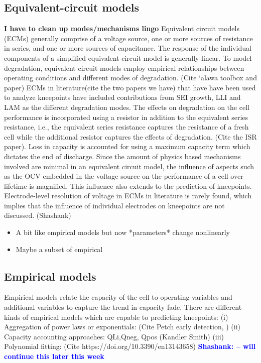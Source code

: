 \documentclass{article}
\newcommand{\ssr}[1]{{\textbf{\textcolor{blue}{Shashank: #1}}}}
\begin{document}
\subsection{Equivalent-circuit models}
\textbf{I have to clean up modes/mechanisms lingo}
Equivalent circuit models (ECMs) generally comprise of a voltage source, one or more sources of resistance in series, and one or more sources of capacitance. The response of the individual components of a simplified equivalent circuit model is generally linear. To model degradation, equivalent circuit models employ empirical relationships between operating conditions and different modes of degradation. (Cite ‘alawa toolbox and paper) ECMs in literature(cite the two papers we have) that have have been used to analyze kneepoints have included contributions from SEI growth, LLI and LAM as the different degradation modes. The effects on degradation on the cell performance is incorporated using a resistor in addition to the equivalent series resistance, i.e., the equivalent series resistance captures the resistance of a fresh cell while the additional resistor captures the effects of degradation. (Cite the ISR paper). Loss in capacity is accounted for using a maximum capacity term which dictates the end of discharge. Since the amount of physics based mechanisms involved are minimal in an equivalent circuit model, the influence of aspects such as the OCV embedded in the voltage source on the performance of a cell over lifetime is magnified. This influence also extends to the prediction of kneepoints. Electrode-level resolution of voltage in ECMs in literature is rarely found, which implies that the influence of individual electrodes on kneepoints are not discussed.
(Shashank)
\begin{itemize}
\item A bit like empirical models but now *parameters* change nonlinearly
\item Maybe a subset of empirical
\end{itemize}

\subsection{Empirical models}
Empirical models relate the capacity of the cell to operating variables and additional variables to capture the trend in capacity fade. There are different kinds of empirical models which are capable to predicting kneepoints:
(i) Aggregation of power laws or exponentials: (Cite Petch early detection, )
(ii) Capacity accounting approaches: QLi,Qneg, Qpos (Kandler Smith)
(iii) Polynomial fitting: (Cite https://doi.org/10.3390/en13143658)
\ssr{-- will continue this later this week}
\end{document}
